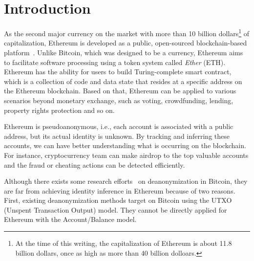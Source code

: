 \section{Introduction}

As the second major currency on the market with more than 10 billion dollars\footnote{At the time of this writing, the capitalization of Ethereum is about 11.8 billion dollars, once as high as more than 40 billion dolloars.} of capitalization, Ethereum is developed as a public, open-sourced blockchain-based platform~\cite{buterin2013ethereum}. Unlike Bitcoin, which was designed to be a currency, Ethereum aims to facilitate software processing using a token system called \emph{Ether} (ETH). Ethereum has the ability for users to build Turing-complete smart contract, which is a collection of code and data state that resides at a specific address on the Ethereum blockchain. Based on that, Ethereum can be applied to various scenarios beyond monetary exchange, such as voting, crowdfunding, lending, property rights protection and so on.


Ethereum is pseudoanonymous, i.e., each account is associated with a public address, but its actual identity is unknown. 
By tracking and inferring these accounts, we can have better understanding what is occurring on the blockchain. For instance, cryptocurrency team can make airdrop to the top valuable accounts and the fraud or cheating actions can be detected efficiently. 
 

Although there exists some research efforts~\cite{reid2013analysis,zhao2015graph} on deanonymization in Bitcoin, they are far from achieving identity inference in Ethereum because of two reasons. First, existing deanonymization methods target on Bitcoin using the UTXO (Unspent Transaction Output) model. They cannot be directly applied for Ethereum with the Account/Balance model. 




